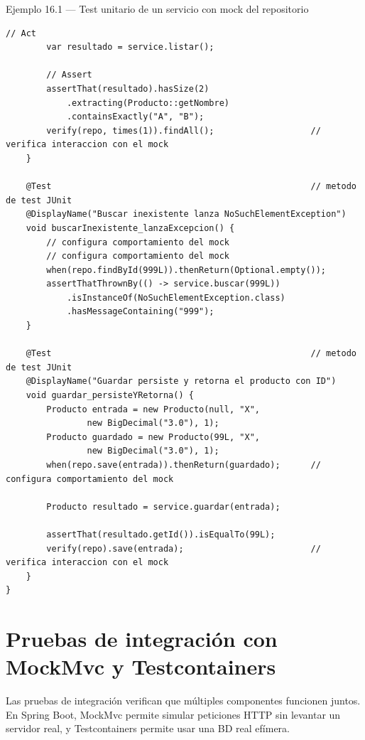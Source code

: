 \documentclass[11pt,a4paper,openany]{book}
\begin{document}
\begin{cajaejemplo}{Ejemplo 16.1 --- Test unitario de un servicio con mock del repositorio}
\begin{lstlisting}[style=java,caption={ProductoServiceTest.java},label=lst:16.1]
        // Act
        var resultado = service.listar();

        // Assert
        assertThat(resultado).hasSize(2)
            .extracting(Producto::getNombre)
            .containsExactly("A", "B");
        verify(repo, times(1)).findAll();                   // verifica interaccion con el mock
    }

    @Test                                                   // metodo de test JUnit
    @DisplayName("Buscar inexistente lanza NoSuchElementException")
    void buscarInexistente_lanzaExcepcion() {
        // configura comportamiento del mock
        // configura comportamiento del mock
        when(repo.findById(999L)).thenReturn(Optional.empty());
        assertThatThrownBy(() -> service.buscar(999L))
            .isInstanceOf(NoSuchElementException.class)
            .hasMessageContaining("999");
    }

    @Test                                                   // metodo de test JUnit
    @DisplayName("Guardar persiste y retorna el producto con ID")
    void guardar_persisteYRetorna() {
        Producto entrada = new Producto(null, "X",
                new BigDecimal("3.0"), 1);
        Producto guardado = new Producto(99L, "X",
                new BigDecimal("3.0"), 1);
        when(repo.save(entrada)).thenReturn(guardado);      // configura comportamiento del mock

        Producto resultado = service.guardar(entrada);

        assertThat(resultado.getId()).isEqualTo(99L);
        verify(repo).save(entrada);                         // verifica interaccion con el mock
    }
}
\end{lstlisting}
\end{cajaejemplo}

\section{Pruebas de integración con MockMvc y Testcontainers}

Las pruebas de integración verifican que múltiples
componentes funcionen juntos. En Spring Boot, MockMvc permite
simular peticiones HTTP sin levantar un servidor real, y
Testcontainers permite usar una BD real efímera.
\end{document}
